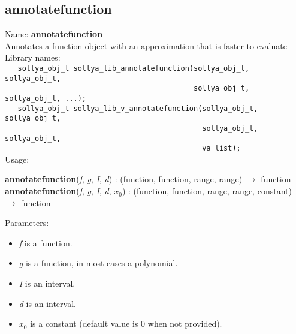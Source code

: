 \subsection{annotatefunction}
\label{labannotatefunction}
\noindent Name: \textbf{annotatefunction}\\
\phantom{aaa}Annotates a \sollya function object with an approximation that is faster to evaluate\\[0.2cm]
\noindent Library names:\\
\verb|   sollya_obj_t sollya_lib_annotatefunction(sollya_obj_t, sollya_obj_t,|\\
\verb|                                            sollya_obj_t, sollya_obj_t, ...);|\\
\verb|   sollya_obj_t sollya_lib_v_annotatefunction(sollya_obj_t, sollya_obj_t,|\\
\verb|                                              sollya_obj_t, sollya_obj_t,|\\
\verb|                                              va_list);|\\[0.2cm]
\noindent Usage: 
\begin{center}
\textbf{annotatefunction}(\emph{f}, \emph{g}, \emph{I}, \emph{d}) : (\textsf{function}, \textsf{function}, \textsf{range}, \textsf{range}) $\rightarrow$ \textsf{function}\\
\textbf{annotatefunction}(\emph{f}, \emph{g}, \emph{I}, \emph{d}, \emph{$x_0$}) : (\textsf{function}, \textsf{function}, \textsf{range}, \textsf{range}, \textsf{constant}) $\rightarrow$ \textsf{function}\\
\end{center}
Parameters: 
\begin{itemize}
\item \emph{f} is a function.
\item \emph{g} is a function, in most cases a polynomial.
\item \emph{I} is an interval.
\item \emph{d} is an interval.
\item \emph{$x_0$} is a constant (default value is $0$ when not provided).
\end{itemize}
